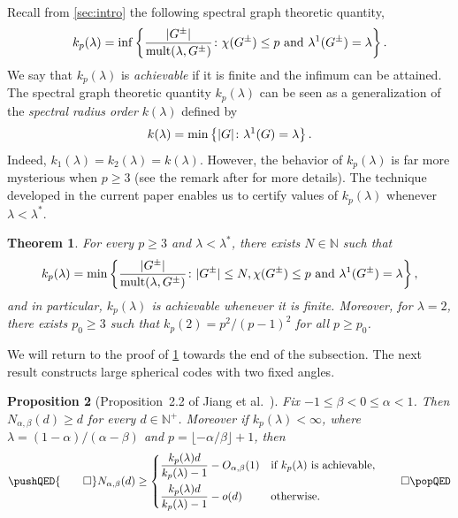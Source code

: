 \documentclass[11pt]{article}
\newtheorem{theorem}{Theorem}[section]
\newtheorem{proposition}[theorem]{Proposition}
\theoremstyle{definition}
\theoremstyle{remark}
\DeclarePairedDelimiter\abs{\lvert}{\rvert}
\newcommand{\dset}[2]{\left\{{#1}\colon{#2}\right\}}
\newcommand{\al}{\alpha}
\newcommand{\be}{\beta}
\newcommand{\la}{\lambda}
\newcommand{\kpl}{k_p(\la)}
\newcommand{\N}{\mathbb{N}}
\newcommand{\Nabd}{N_{\al,\be}(d)}
\newcommand{\mult}{\operatorname{mult}}
\begin{document}
Recall from \cref{sec:intro} the following spectral graph theoretic quantity,
\begin{equation} \label{def:kpl}
    \kpl = \inf\dset{\frac{\abs{G^\pm}}{\mult(\la, G^\pm)}}{\chi(G^\pm) \le p \text{ and }\la^1(G^\pm) = \la}.
\end{equation}
We say that $k_p(\la)$ is \emph{achievable} if it is finite and the infimum can be attained. The spectral graph theoretic quantity $k_p(\la)$ can be seen as a generalization of the \emph{spectral radius order} $k(\la)$ defined by
\[
    k(\la) = \min\dset{\abs{G}}{\la^1(G) = \la}.
\]
Indeed, $k_1(\la) = k_2(\la) = k(\la)$. However, the behavior of $k_p(\la)$ is far more mysterious when $p \ge 3$ (see the remark after \cite[Definition~1.10]{JTYZZ23} for more details). The technique developed in the current paper enables us to certify values of $\kpl$ whenever $\la < \la^*$.

\begin{theorem} \label{thm:kpl}
    For every $p \ge 3$ and $\la < \la^*$, there exists $N \in \N$ such that
    \[
        \kpl = \min\dset{\frac{\abs{G^\pm}}{\mult(\la, G^\pm)}}{\abs{G^\pm} \le N, \chi(G^\pm) \le p \text{ and }\la^1(G^\pm) = \la},
    \]
    and in particular, $\kpl$ is achievable whenever it is finite. Moreover, for $\la = 2$, there exists $p_0 \ge 3$ such that $k_p(2) = p^2/(p-1)^2$ for all $p \ge p_0$.
\end{theorem}

We will return to the proof of \cref{thm:kpl} towards the end of the subsection. The next result constructs large spherical codes with two fixed angles.

\begin{proposition}[Proposition~2.2 of Jiang et al.~\cite{JTYZZ23}] \label{thm:lower-bound}
    Fix $-1 \le \be < 0 \le \al < 1$. Then $\Nabd \ge d$ for every $d \in \N^+$. Moreover if $\kpl < \infty$, where $\la =(1-\al)/(\al - \be)$ and $p = \lfloor -\al/\be \rfloor + 1$, then
    \begin{equation*}
        \pushQED{\qed}
        N_{\al,\be}(d) \ge \begin{dcases}
            \frac{\kpl d}{\kpl-1} - O_{\al,\be}(1) & \text{if }\kpl \text{ is achievable}, \\
            \frac{\kpl d}{\kpl-1} - o(d) & \text{otherwise}.
        \end{dcases} \qedhere
        \popQED
    \end{equation*}
\end{proposition}
\end{document}
